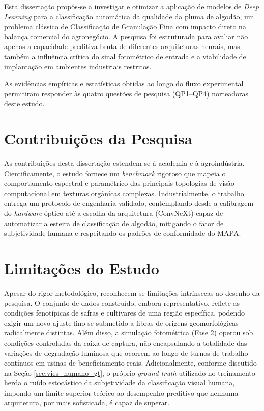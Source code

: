 
Esta dissertação propôs-se a investigar e otimizar a aplicação de modelos de \textit{Deep Learning} para a classificação automática da qualidade da pluma de algodão, um problema clássico de Classificação de Granulação Fina com impacto direto na balança comercial do agronegócio. A pesquisa foi estruturada para avaliar não apenas a capacidade preditiva bruta de diferentes arquiteturas neurais, mas também a influência crítica do sinal fotométrico de entrada e a viabilidade de implantação em ambientes industriais restritos. 

As evidências empíricas e estatísticas obtidas ao longo do fluxo experimental permitiram responder às quatro questões de pesquisa (QP1--QP4) norteadoras deste estudo.



\section{Contribuições da Pesquisa}
\label{sec:contribuicoes}

As contribuições desta dissertação estendem-se à academia e à agroindústria. Cientificamente, o estudo fornece um \textit{benchmark} rigoroso que mapeia o comportamento espectral e paramétrico das principais topologias de visão computacional em texturas orgânicas complexas. Industrialmente, o trabalho entrega um protocolo de engenharia validado, contemplando desde a calibragem do \textit{hardware} óptico até a escolha da arquitetura (ConvNeXt) capaz de automatizar a esteira de classificação de algodão, mitigando o fator de subjetividade humana e respeitando os padrões de conformidade do MAPA.

\section{Limitações do Estudo}
\label{sec:limitacoes}

Apesar do rigor metodológico, reconhecem-se limitações intrínsecas ao desenho da pesquisa. O conjunto de dados construído, embora representativo, reflete as condições fenotípicas de safras e cultivares de uma região específica, podendo exigir um novo ajuste fino se submetido a fibras de origens geomorfológicas radicalmente distintas. Além disso, a simulação fotométrica (Fase 2) operou sob condições controladas da caixa de captura, não encapsulando a totalidade das variações de degradação luminosa que ocorrem ao longo de turnos de trabalho contínuos em usinas de beneficiamento reais. Adicionalmente, conforme discutido na Seção \ref{sec:vies_humano_gt}, o próprio \textit{ground truth} utilizado no treinamento herda o ruído estocástico da subjetividade da classificação visual humana, impondo um limite superior teórico ao desempenho preditivo que nenhuma arquitetura, por mais sofisticada, é capaz de superar.

